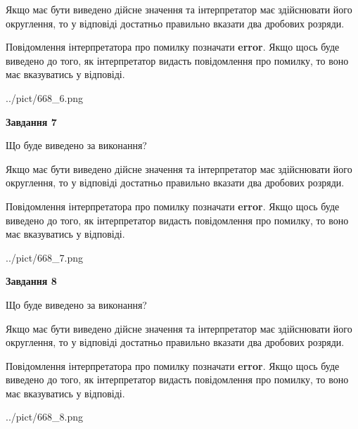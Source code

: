 \documentclass[12pt, ukrainian]{article}
\begin{document}
{\begin {Large}
Якщо має бути виведено дійсне значення та інтерпретатор має здійснювати його округлення, 
то у відповіді достатньо правильно вказати два дробових розряди.

Повідомлення інтерпретатора про помилку позначати \textbf{error}.
Якщо щось буде виведено до того, як інтерпретатор видасть повідомлення про помилку, 
то воно має вказуватись у відповіді. \par

\begin{center}
	{../pict/668_6.png}
\end{center}
\newpage

{\begin {center}\textbf{Завдання 7}\end {center}}\par
Що буде виведено за виконання? \par

Якщо має бути виведено дійсне значення та інтерпретатор має здійснювати його округлення, 
то у відповіді достатньо правильно вказати два дробових розряди.

Повідомлення інтерпретатора про помилку позначати \textbf{error}.
Якщо щось буде виведено до того, як інтерпретатор видасть повідомлення про помилку, 
то воно має вказуватись у відповіді. \par

\begin{center}
	{../pict/668_7.png}
\end{center}
\newpage

{\begin {center}\textbf{Завдання 8}\end {center}}\par
Що буде виведено за виконання? \par

Якщо має бути виведено дійсне значення та інтерпретатор має здійснювати його округлення, 
то у відповіді достатньо правильно вказати два дробових розряди.

Повідомлення інтерпретатора про помилку позначати \textbf{error}.
Якщо щось буде виведено до того, як інтерпретатор видасть повідомлення про помилку, 
то воно має вказуватись у відповіді. \par

\begin{center}
	{../pict/668_8.png}
\end{center}
\newpage


\end{Large}}
\end{document}
